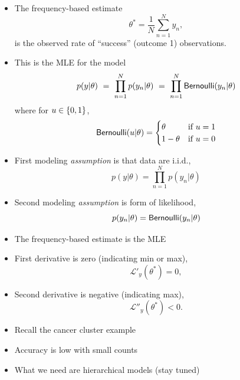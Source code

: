 \documentclass[10pt]{report}
\begin{document}
%
\begin{itemize}
\item The frequency-based estimate 
\[
\theta^{*} = \frac{1}{N} \sum_{n=1}^N y_n, 
\]
is the observed rate of ``success'' (outcome 1) observations.
\item This is the MLE for the model
\[
p(y|\theta) 
\ = \ \prod_{n=1}^N p(y_n|\theta) 
\ = \  \prod_{n=1}^N \text{\sf Bernoulli}(y_n|\theta) 
\]
where for $u \in \{ 0,1 \}$, 
{\small
\[
\text{\sf Bernoulli}(u|\theta) = 
\begin{cases}
\theta & \text{if } u = 1 
\\
1 - \theta & \text{if } u = 0
\end{cases}
\]
}
\end{itemize}


%
\vspace*{-4pt}
\begin{itemize}
\item First modeling \emph{assumption} is that data are i.i.d.,
\[
p(y|\theta) = \prod_{n=1}^N p(y_n|\theta)
\] 
\item Second modeling \emph{assumption} is form of likelihood,
\[
p(y_n|\theta) = \text{\sf Bernoulli}(y_n|\theta)
\]
\end{itemize}


%
\begin{itemize}
\item The frequency-based estimate is the MLE
\item First derivative is zero (indicating min or max),
\[
\mathcal{L}'_y(\theta^*) = 0,
\]
\item Second derivative is negative (indicating max),
\[
\mathcal{L}''_y(\theta^*) < 0.
\]
\end{itemize}


%
\begin{itemize}
\item Recall the cancer cluster example
\item Accuracy is low with small counts
\item What we need are hierarchical models (stay tuned)
\end{itemize}


\end{document}
